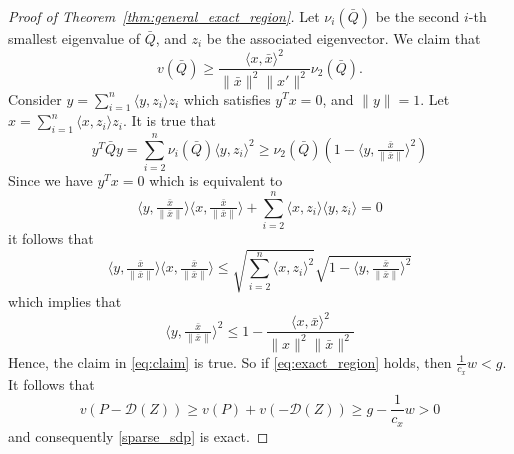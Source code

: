\documentclass[10pt,a4paper]{amsart}
\newcommand{\cD}{{\mathcal{D}}}
\begin{document}
\begin{proof}[Proof of Theorem~\ref{thm:general_exact_region}]
        Let \(\nu_i(\bar Q)\) be the second \(i\)-th smallest eigenvalue of \(\bar Q\), and \(z_i\) be the associated eigenvector. We claim that 
        \begin{equation}\label{eq:claim}
        v(\bar Q) \geq \frac{\langle x, \bar x\rangle^2}{\|\bar x\|^2\|x'\|^2} \nu_2(\bar Q).
        \end{equation}
        Consider \(y = \sum_{i=1}^n \langle y,z_i\rangle z_i\) which satisfies \(y^T x = 0\), and \(\|y\|=1\). Let \(x = \sum_{i=1}^n \langle x,z_i\rangle z_i\). It is true that
        \[
        y^T \bar Q y = \sum_{i=2}^n \nu_i(\bar Q) \langle y,z_i\rangle^2 \geq \nu_2(\bar Q) (1 - \langle y,\tfrac{\bar x}{\|\bar x\|}\rangle^2)
        \]
        Since we have \(y^Tx=0\) which is equivalent to 
        \[
         \langle y,\tfrac{\bar x}{\|\bar x\|} \rangle \langle x,\tfrac{\bar x}{\|\bar x\|} \rangle + \sum_{i=2}^n \langle x,z_i \rangle  \langle y,z_i \rangle = 0
        \]
        it follows that
        \[
         \langle y,\tfrac{\bar x}{\|\bar x\|} \rangle \langle x,\tfrac{\bar x}{\|\bar x\|} \rangle \leq \sqrt{\textstyle\sum_{i=2}^n  \langle x,z_i \rangle^2} \sqrt{1 - \langle y,\tfrac{\bar x}{\|\bar x\|} \rangle^2}
        \]
        which implies that
        \[
        \langle y,\tfrac{\bar x}{\|\bar x\|} \rangle^2\leq 1 - \frac{\langle x,\bar x \rangle^2}{\|x\|^2\|\bar x\|^2}
        \]
        Hence, the claim in \eqref{eq:claim} is true. 
        So if \eqref{eq:exact_region} holds, then $\frac{1}{c_{x}}  w <  g$. It follows that
		\[
		v(P-\cD(Z)) \geq v(P) + v(-\cD(Z))\geq g -  \frac{1}{c_{x}}  w> 0
		\]
		and consequently \eqref{sparse_sdp} is exact. 
	\end{proof}
\end{document}
